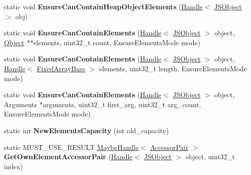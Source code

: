 \begin{DoxyCompactItemize}
\item 
\hypertarget{classv8_1_1internal_1_1_j_s_object_a341090eaa5e24dd4bbecd049e44d72ef}{}static void {\bfseries Ensure\+Can\+Contain\+Heap\+Object\+Elements} (\hyperlink{classv8_1_1internal_1_1_handle}{Handle}$<$ \hyperlink{classv8_1_1internal_1_1_j_s_object}{J\+S\+Object} $>$ obj)\label{classv8_1_1internal_1_1_j_s_object_a341090eaa5e24dd4bbecd049e44d72ef}

\item 
\hypertarget{classv8_1_1internal_1_1_j_s_object_abfa1be1a1e484b51bc3b4f598a95da3f}{}static void {\bfseries Ensure\+Can\+Contain\+Elements} (\hyperlink{classv8_1_1internal_1_1_handle}{Handle}$<$ \hyperlink{classv8_1_1internal_1_1_j_s_object}{J\+S\+Object} $>$ object, \hyperlink{classv8_1_1internal_1_1_object}{Object} $\ast$$\ast$elements, uint32\+\_\+t count, Ensure\+Elements\+Mode mode)\label{classv8_1_1internal_1_1_j_s_object_abfa1be1a1e484b51bc3b4f598a95da3f}

\item 
\hypertarget{classv8_1_1internal_1_1_j_s_object_ab287ab1b3b49b1d237ba1a8598997148}{}static void {\bfseries Ensure\+Can\+Contain\+Elements} (\hyperlink{classv8_1_1internal_1_1_handle}{Handle}$<$ \hyperlink{classv8_1_1internal_1_1_j_s_object}{J\+S\+Object} $>$ object, \hyperlink{classv8_1_1internal_1_1_handle}{Handle}$<$ \hyperlink{classv8_1_1internal_1_1_fixed_array_base}{Fixed\+Array\+Base} $>$ elements, uint32\+\_\+t length, Ensure\+Elements\+Mode mode)\label{classv8_1_1internal_1_1_j_s_object_ab287ab1b3b49b1d237ba1a8598997148}

\item 
\hypertarget{classv8_1_1internal_1_1_j_s_object_a4cf79e36cdbb1e7fe97389ba3938bdf2}{}static void {\bfseries Ensure\+Can\+Contain\+Elements} (\hyperlink{classv8_1_1internal_1_1_handle}{Handle}$<$ \hyperlink{classv8_1_1internal_1_1_j_s_object}{J\+S\+Object} $>$ object, Arguments $\ast$arguments, uint32\+\_\+t first\+\_\+arg, uint32\+\_\+t arg\+\_\+count, Ensure\+Elements\+Mode mode)\label{classv8_1_1internal_1_1_j_s_object_a4cf79e36cdbb1e7fe97389ba3938bdf2}

\item 
\hypertarget{classv8_1_1internal_1_1_j_s_object_a9509ba3f8009eefa3b7ebbeec07e3633}{}static int {\bfseries New\+Elements\+Capacity} (int old\+\_\+capacity)\label{classv8_1_1internal_1_1_j_s_object_a9509ba3f8009eefa3b7ebbeec07e3633}

\item 
\hypertarget{classv8_1_1internal_1_1_j_s_object_a11eaecb5a1f5a3ac5696baf1e3533449}{}static M\+U\+S\+T\+\_\+\+U\+S\+E\+\_\+\+R\+E\+S\+U\+L\+T \hyperlink{classv8_1_1internal_1_1_maybe_handle}{Maybe\+Handle}$<$ \hyperlink{classv8_1_1internal_1_1_accessor_pair}{Accessor\+Pair} $>$ {\bfseries Get\+Own\+Element\+Accessor\+Pair} (\hyperlink{classv8_1_1internal_1_1_handle}{Handle}$<$ \hyperlink{classv8_1_1internal_1_1_j_s_object}{J\+S\+Object} $>$ object, uint32\+\_\+t index)\label{classv8_1_1internal_1_1_j_s_object_a11eaecb5a1f5a3ac5696baf1e3533449}


\end{DoxyCompactItemize}
